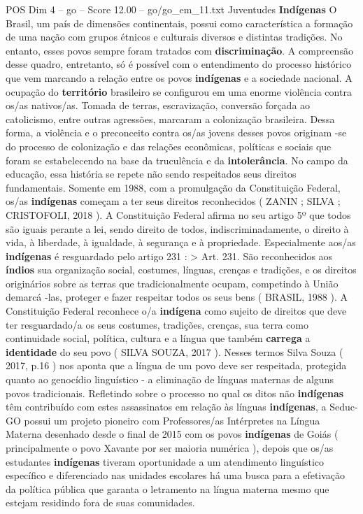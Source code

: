 \begin{textsample}{POS Dim 4 – go – Score 12.00 – go/go\_em\_11.txt}  \label{ex:f4_pos_068}
Juventudes \textbf{Indígenas} O Brasil, um país de dimensões continentais, possui como característica a formação de uma nação com grupos étnicos e culturais diversos e distintas tradições.
No entanto, esses povos sempre foram tratados com \textbf{discriminação}.
A compreensão desse quadro, entretanto, só é possível com o entendimento do processo histórico que vem marcando a relação entre os povos \textbf{indígenas} e a sociedade nacional.
A ocupação do \textbf{território} brasileiro se configurou em uma enorme violência contra os/as nativos/as.
Tomada de terras, escravização, conversão forçada ao catolicismo, entre outras agressões, marcaram a colonização brasileira.
Dessa forma, a violência e o preconceito contra os/as jovens desses povos originam -se do processo de colonização e das relações econômicas, políticas e sociais que foram se estabelecendo na base da truculência e da \textbf{intolerância}.
No campo da educação, essa história se repete não sendo respeitados seus direitos fundamentais.
Somente em 1988, com a promulgação da Constituição Federal, os/as \textbf{indígenas} começam a ter seus direitos reconhecidos ( ZANIN ; SILVA ; CRISTOFOLI, 2018 ).
A Constituição Federal afirma no seu artigo 5º que todos são iguais perante a lei, sendo direito de todos, indiscriminadamente, o direito à vida, à liberdade, à igualdade, à segurança e à propriedade.
Especialmente aos/as \textbf{indígenas} é resguardado pelo artigo 231 : > Art. 231.
São reconhecidos aos \textbf{índios} sua organização social, costumes, línguas, crenças e tradições, e os direitos originários sobre as terras que tradicionalmente ocupam, competindo à União demarcá -las, proteger e fazer respeitar todos os seus bens ( BRASIL, 1988 ).
A Constituição Federal reconhece o/a \textbf{indígena} como sujeito de direitos que deve ter resguardado/a os seus costumes, tradições, crenças, sua terra como continuidade social, política, cultura e a língua que também \textbf{carrega} a \textbf{identidade} do seu povo ( SILVA SOUZA, 2017 ).
Nesses termos Silva Souza ( 2017, p.16 ) nos aponta que a língua de um povo deve ser respeitada, protegida quanto ao genocídio linguístico - a eliminação de línguas maternas de alguns povos tradicionais.
Refletindo sobre o processo no qual os ditos não \textbf{indígenas} têm contribuído com estes assassinatos em relação às línguas \textbf{indígenas}, a Seduc-GO possui um projeto pioneiro com Professores/as Intérpretes na Língua Materna desenhado desde o final de 2015 com os povos \textbf{indígenas} de Goiás ( principalmente o povo Xavante por ser maioria numérica ), depois que os/as estudantes \textbf{indígenas} tiveram oportunidade a um atendimento linguístico específico e diferenciado nas unidades escolares há uma busca para a efetivação da política pública que garanta o letramento na língua materna mesmo que estejam residindo fora de suas comunidades.

\end{textsample}
